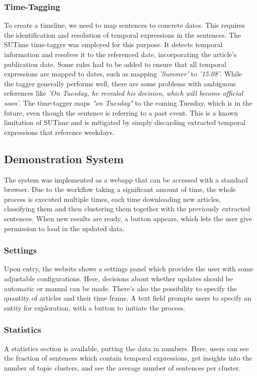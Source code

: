 \documentclass[sigconf]{acmart}
\begin{document}
\subsubsection{Time-Tagging}
To create a timeline, we need to map sentences to concrete dates. This requires the identification and resolution of temporal expressions in the sentences. The SUTime time-tagger \cite{sutime} was employed for this purpose. It detects temporal information and resolves it to the referenced date, incorporating the article's publication date.
Some rules had to be added to ensure that all temporal expressions are mapped to dates, such as mapping \textit{'Summer'} to \textit{'15.08'}.
While the tagger generally performs well, there are some problems with ambiguous references like \textit{'On Tuesday, he revealed his decision, which will become official soon'}.
The time-tagger maps \textit{"on Tuesday"} to the coming Tuesday, which is in the future, even though the sentence is referring to a past event. This is a known limitation of SUTime and is mitigated by simply discarding extracted temporal expressions that reference weekdays.

\subsection{Demonstration System}
The system was implemented as a webapp that can be accessed with a standard browser. Due to the workflow taking a significant amount of time, the whole process is executed multiple times, each time downloading new articles, classifying them and then clustering them together with the previously extracted sentences. When new results are ready, a button appears, which lets the user give permission to load in the updated data.

\subsubsection{Settings}
Upon entry, the website shows a settings panel which provides the user with some adjustable configurations. Here, decisions about whether updates should be automatic or manual can be made. There's also the possibility to specify the quantity of articles and their time frame. A text field prompts users to specify an entity for exploration, with a button to initiate the process.

\subsubsection{Statistics}
A statistics section is available, putting the data in numbers. Here, users can see the fraction of sentences which contain temporal expressions, get insights into the number of topic clusters, and see the average number of sentences per cluster.
\end{document}
